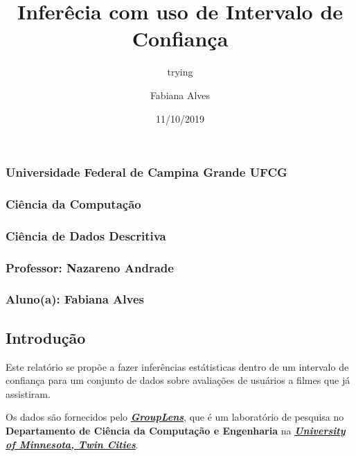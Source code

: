\documentclass[]{article}
\title{Inferêcia com uso de Intervalo de Confiança}
\subtitle{trying}
\author{Fabiana Alves}
\date{11/10/2019}
\begin{document}
\maketitle

\subsubsection{Universidade Federal de Campina Grande \textbar{}
UFCG}\label{universidade-federal-de-campina-grande-ufcg}

\subsubsection{Ciência da
Computação}\label{ciuxeancia-da-computauxe7uxe3o}

\subsubsection{Ciência de Dados
Descritiva}\label{ciuxeancia-de-dados-descritiva}

\subsubsection{\texorpdfstring{\textbf{Professor}: Nazareno
Andrade}{Professor: Nazareno Andrade}}\label{professor-nazareno-andrade}

\subsubsection{\texorpdfstring{\textbf{Aluno(a)}: Fabiana
Alves}{Aluno(a): Fabiana Alves}}\label{alunoa-fabiana-alves}

\newpage

\subsection{Introdução}\label{introduuxe7uxe3o}

Este relatório se propõe a fazer inferências estátisticas dentro de um
intervalo de confiança para um conjunto de dados sobre avaliações de
usuários a filmes que já assistiram.

Os dados são fornecidos pelo
\textbf{\emph{\href{https://grouplens.org/about/what-is-grouplens/}{GroupLens}}},
que é um laboratório de pesquisa no \textbf{Departamento de Ciência da
Computação e Engenharia} na
\textbf{\emph{\href{https://twin-cities.umn.edu/}{University of
Minnesota, Twin Cities}}}.
\end{document}
